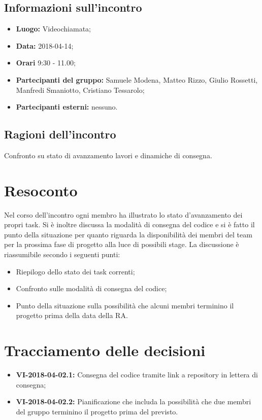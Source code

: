 \documentclass[openany,12pt,a4paper]{article}
\begin{document}
  \subsection{Informazioni sull'incontro} 
   
  \begin{itemize}  
      \item \textbf{Luogo:} Videochiamata;
      \item \textbf{Data:} 2018-04-14; 
      \item \textbf{Orari} 9:30 - 11.00;
      \item \textbf{Partecipanti del gruppo:} Samuele Modena, Matteo Rizzo, Giulio Rossetti, Manfredi Smaniotto, Cristiano Tessarolo; 
      \item \textbf{Partecipanti esterni:} nessuno. 
  \end{itemize} 
 
  \subsection{Ragioni dell'incontro} 
  Confronto su stato di avanzamento lavori e dinamiche di consegna.
 
  \section{Resoconto} 
  Nel corso dell'incontro ogni membro ha illustrato lo stato d'avanzamento dei propri task. Si è inoltre discussa la modalità di consegna del codice e si è fatto il punto della situazione per quanto riguarda la disponibilità dei membri del team per la prossima fase di progetto alla luce di possibili stage. La discussione è riassumibile secondo i seguenti punti:   
	
  \begin{itemize}
	\item Riepilogo dello stato dei task correnti;
	\item Confronto sulle modalità di consegna del codice;
	\item Punto della situazione sulla possibilità che alcuni membri terminino il progetto prima della data della RA.
  \end{itemize}

  \section{Tracciamento delle decisioni} 
   
  \begin{itemize} 
      \item \textbf{VI-2018-04-02.1:} Consegna del codice tramite link a repository in lettera di consegna;
      \item \textbf{VI-2018-04-02.2:} Pianificazione che includa la possibilità che due membri del gruppo terminino il progetto prima del previsto.
  \end{itemize} 
   
  
\end{document}
